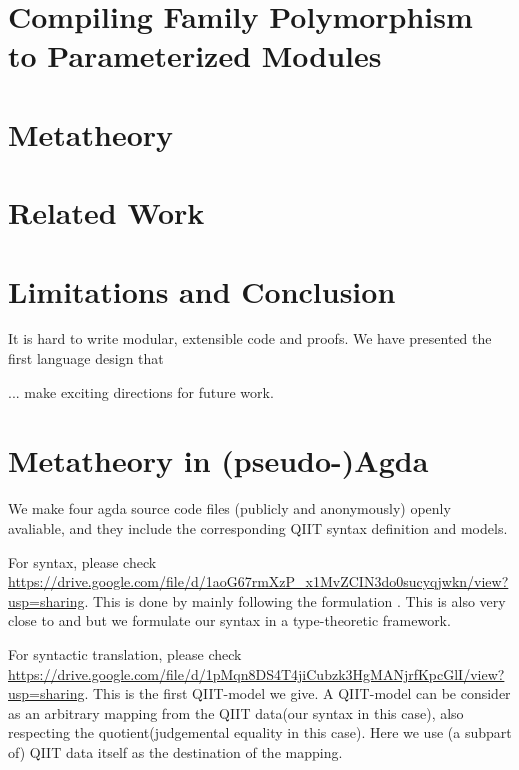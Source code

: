 \section{Compiling Family Polymorphism to Parameterized Modules}
\label{sec:coqimpl}



\section{Metatheory}
\label{sec:metatheory2}


\section{Related Work}\label{sec:related-work}


\section{Limitations and Conclusion}
\label{sec:conclusion}

It is hard to write modular, extensible code and proofs.
We have presented the first language design that

... make exciting directions for future work.


\setlength{\bibsep}{.8ex}



\appendix

\section{Metatheory in (pseudo-)Agda}
We make four agda source code files (publicly and anonymously) openly avaliable, and they include the corresponding QIIT syntax definition and models. 

For syntax, please check \\ \href{https://drive.google.com/file/d/1aoG67rmXzP_x1MvZCIN3do0sucyqjwkn/view?usp=sharing}{https://drive.google.com/file/d/1aoG67rmXzP_x1MvZCIN3do0sucyqjwkn/view?usp=sharing}. This is done by mainly following the formulation \citet{altkap2016}. This is also very close to \citet{coquand2018canonicity} and \citet{sterling2019algebraic} but we formulate our syntax in a type-theoretic framework.

For syntactic translation, please check \\ \href{https://drive.google.com/file/d/1pMqn8DS4T4jiCubzk3HgMANjrfKpcGlI/view?usp=sharing}{https://drive.google.com/file/d/1pMqn8DS4T4jiCubzk3HgMANjrfKpcGlI/view?usp=sharing}. This is the first QIIT-model we give. A QIIT-model can be consider as an arbitrary mapping from the QIIT data(our syntax in this case), also respecting the quotient(judgemental equality in this case). Here we use (a subpart of) QIIT data itself as the destination of the mapping. 

